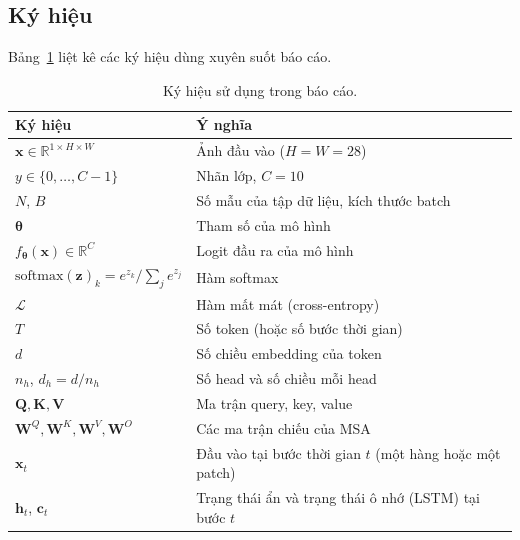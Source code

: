 \documentclass[a4paper,12pt]{article}
\begin{document}
\subsection{Ký hiệu}
Bảng~\ref{tab:notation} liệt kê các ký hiệu dùng xuyên suốt báo cáo.

\begin{table}[ht]
    \centering
    \caption{Ký hiệu sử dụng trong báo cáo.}
    \label{tab:notation}
    \begin{tabular}{ll}
        \toprule
        Ký hiệu                                                          & Ý nghĩa                                                  \\
        \midrule
        $\mathbf{x} \in \mathbb{R}^{1 \times H \times W}$                & Ảnh đầu vào ($H = W = 28$)                               \\
        $y \in \{0, \dots, C-1\}$                                        & Nhãn lớp, $C = 10$                                       \\
        $N$, $B$                                                         & Số mẫu của tập dữ liệu, kích thước batch                 \\
        $\boldsymbol{\theta}$                                            & Tham số của mô hình                                      \\
        $f_{\boldsymbol{\theta}}(\mathbf{x}) \in \mathbb{R}^{C}$         & Logit đầu ra của mô hình                                 \\
        $\mathrm{softmax}(\mathbf{z})_k = e^{z_k} / \sum_j e^{z_j}$      & Hàm softmax                                              \\
        $\mathcal{L}$                                                    & Hàm mất mát (cross-entropy)                              \\
        \midrule
        $T$                                                              & Số token (hoặc số bước thời gian)                        \\
        $d$                                                              & Số chiều embedding của token                             \\
        $n_h$, $d_h = d / n_h$                                           & Số head và số chiều mỗi head                             \\
        $\mathbf{Q}, \mathbf{K}, \mathbf{V}$                             & Ma trận query, key, value                                \\
        $\mathbf{W}^{Q}, \mathbf{W}^{K}, \mathbf{W}^{V}, \mathbf{W}^{O}$ & Các ma trận chiếu của MSA                                \\
        \midrule
        $\mathbf{x}_t$                                                   & Đầu vào tại bước thời gian $t$ (một hàng hoặc một patch) \\
        $\mathbf{h}_t$, $\mathbf{c}_t$                                   & Trạng thái ẩn và trạng thái ô nhớ (LSTM) tại bước $t$    \\
        \bottomrule
    \end{tabular}
\end{table}
\end{document}
